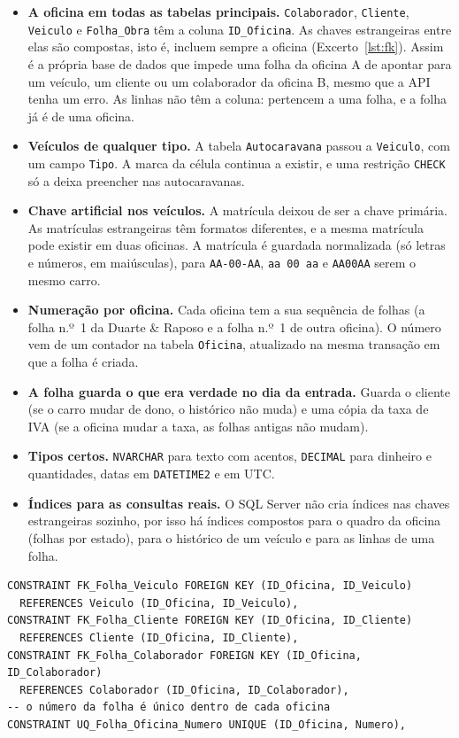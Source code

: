 \documentclass[a4paper,12pt]{article}
\begin{document}
\begin{itemize}
    \item \textbf{A oficina em todas as tabelas principais.} \texttt{Colaborador}, \texttt{Cliente}, \texttt{Veiculo} e \texttt{Folha\_Obra} têm a coluna \texttt{ID\_Oficina}. As chaves estrangeiras entre elas são compostas, isto é, incluem sempre a oficina (Excerto~\ref{lst:fk}). Assim é a própria base de dados que impede uma folha da oficina A de apontar para um veículo, um cliente ou um colaborador da oficina B, mesmo que a \ac{API} tenha um erro. As linhas não têm a coluna: pertencem a uma folha, e a folha já é de uma oficina.
    \item \textbf{Veículos de qualquer tipo.} A tabela \texttt{Autocaravana} passou a \texttt{Veiculo}, com um campo \texttt{Tipo}. A marca da célula continua a existir, e uma restrição \texttt{CHECK} só a deixa preencher nas autocaravanas.
    \item \textbf{Chave artificial nos veículos.} A matrícula deixou de ser a chave primária. As matrículas estrangeiras têm formatos diferentes, e a mesma matrícula pode existir em duas oficinas. A matrícula é guardada normalizada (só letras e números, em maiúsculas), para \texttt{AA-00-AA}, \texttt{aa 00 aa} e \texttt{AA00AA} serem o mesmo carro.
    \item \textbf{Numeração por oficina.} Cada oficina tem a sua sequência de folhas (a folha n.º~1 da Duarte \& Raposo e a folha n.º~1 de outra oficina). O número vem de um contador na tabela \texttt{Oficina}, atualizado na mesma transação em que a folha é criada.
    \item \textbf{A folha guarda o que era verdade no dia da entrada.} Guarda o cliente (se o carro mudar de dono, o histórico não muda) e uma cópia da taxa de \ac{IVA} (se a oficina mudar a taxa, as folhas antigas não mudam).
    \item \textbf{Tipos certos.} \texttt{NVARCHAR} para texto com acentos, \texttt{DECIMAL} para dinheiro e quantidades, datas em \texttt{DATETIME2} e em UTC.
    \item \textbf{Índices para as consultas reais.} O SQL Server não cria índices nas chaves estrangeiras sozinho, por isso há índices compostos para o quadro da oficina (folhas por estado), para o histórico de um veículo e para as linhas de uma folha.
\end{itemize}

\begin{lstlisting}[caption={Chaves estrangeiras compostas da tabela \texttt{Folha\_Obra}.},label={lst:fk}]
CONSTRAINT FK_Folha_Veiculo FOREIGN KEY (ID_Oficina, ID_Veiculo)
  REFERENCES Veiculo (ID_Oficina, ID_Veiculo),
CONSTRAINT FK_Folha_Cliente FOREIGN KEY (ID_Oficina, ID_Cliente)
  REFERENCES Cliente (ID_Oficina, ID_Cliente),
CONSTRAINT FK_Folha_Colaborador FOREIGN KEY (ID_Oficina, ID_Colaborador)
  REFERENCES Colaborador (ID_Oficina, ID_Colaborador),
-- o número da folha é único dentro de cada oficina
CONSTRAINT UQ_Folha_Oficina_Numero UNIQUE (ID_Oficina, Numero),
\end{lstlisting}
\end{document}
